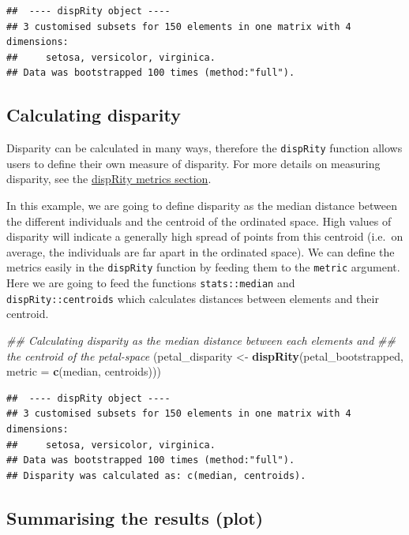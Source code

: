 \documentclass[
]{book}
\newenvironment{Shaded}{\begin{snugshade}}{\end{snugshade}}
\newcommand{\CommentTok}[1]{\textcolor[rgb]{0.56,0.35,0.01}{\textit{#1}}}
\newcommand{\DataTypeTok}[1]{\textcolor[rgb]{0.13,0.29,0.53}{#1}}
\newcommand{\KeywordTok}[1]{\textcolor[rgb]{0.13,0.29,0.53}{\textbf{#1}}}
\newcommand{\NormalTok}[1]{#1}
\newcommand{\StringTok}[1]{\textcolor[rgb]{0.31,0.60,0.02}{#1}}
\begin{document}
\begin{verbatim}
##  ---- dispRity object ---- 
## 3 customised subsets for 150 elements in one matrix with 4 dimensions:
##     setosa, versicolor, virginica.
## Data was bootstrapped 100 times (method:"full").
\end{verbatim}

\hypertarget{calculating-disparity}{%
\subsection{Calculating disparity}\label{calculating-disparity}}

Disparity can be calculated in many ways, therefore the \texttt{dispRity} function allows users to define their own measure of disparity.
For more details on measuring disparity, see the \protect\hyperlink{disparity-metrics}{dispRity metrics section}.

In this example, we are going to define disparity as the median distance between the different individuals and the centroid of the ordinated space.
High values of disparity will indicate a generally high spread of points from this centroid (i.e.~on average, the individuals are far apart in the ordinated space).
We can define the metrics easily in the \texttt{dispRity} function by feeding them to the \texttt{metric} argument.
Here we are going to feed the functions \texttt{stats::median} and \texttt{dispRity::centroids} which calculates distances between elements and their centroid.

\begin{Shaded}
\begin{Highlighting}[]
\CommentTok{\#\# Calculating disparity as the median distance between each elements and}
\CommentTok{\#\# the centroid of the petal{-}space}
\NormalTok{(petal\_disparity \textless{}{-}}\StringTok{ }\KeywordTok{dispRity}\NormalTok{(petal\_bootstrapped, }\DataTypeTok{metric =} \KeywordTok{c}\NormalTok{(median, centroids)))}
\end{Highlighting}
\end{Shaded}

\begin{verbatim}
##  ---- dispRity object ---- 
## 3 customised subsets for 150 elements in one matrix with 4 dimensions:
##     setosa, versicolor, virginica.
## Data was bootstrapped 100 times (method:"full").
## Disparity was calculated as: c(median, centroids).
\end{verbatim}

\hypertarget{summarising-the-results-plot}{%
\subsection{Summarising the results (plot)}\label{summarising-the-results-plot}}
\end{document}

